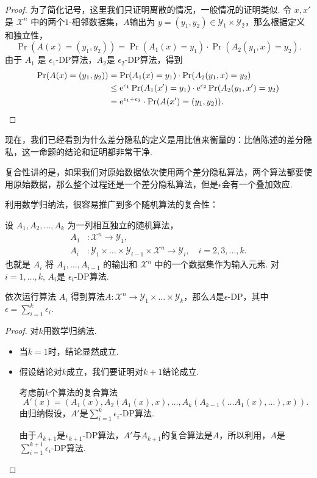 \begin{proof}
为了简化记号，这里我们只证明离散的情况，一般情况的证明类似. 令 $x,x'$ 是 $\mathcal X^n$ 中的两个$1$-相邻数据集，$A$输出为 $y = (y_1, y_2) \in \mathcal Y_1 \times \mathcal Y_2$，那么根据定义和独立性，
    \[
    \Pr(A(x) = (y_1, y_2)) = \Pr(A_1(x) = y_1) \cdot \Pr(A_2(y_1, x) = y_2).
    \]
由于 $A_1$ 是 $\epsilon_1$-DP算法，$A_2$是 $\epsilon_2$-DP算法，得到
    \[
    \begin{aligned}
        \Pr(A(x) = (y_1, y_2)) &= \Pr(A_1(x) = y_1) \cdot \Pr(A_2(y_1, x) = y_2)\\
        &\leq \mathrm{e}^{\epsilon_1} \Pr(A_1(x') = y_1) \cdot \mathrm{e}^{\epsilon_2} \Pr(A_2(y_1, x') = y_2) \\
        &= \mathrm{e}^{\epsilon_1 + \epsilon_2} \cdot \Pr(A(x') = (y_1, y_2)).
    \end{aligned}
    \]
\end{proof}

现在，我们已经看到为什么差分隐私的定义是用比值来衡量的：比值陈述的差分隐私，这一命题的结论和证明都非常干净. 

复合性讲的是，如果我们对原始数据依次使用两个差分隐私算法，两个算法都要使用原始数据，那么整个过程还是一个差分隐私算法，但是$\epsilon$会有一个叠加效应. 

利用数学归纳法，很容易推广到多个随机算法的复合性：

\begin{proposition}\label{proposition:composition-multi}
    设 $A_1, A_2, \dots , A_k$ 为一列相互独立的随机算法， 
    \begin{align*}
        A_1&: \mathcal X^n \to \mathcal Y_1,\\
        A_i&: \mathcal Y_1 \times \dots \times \mathcal Y_{i-1} \times \mathcal X^n \to \mathcal Y_i,\quad i = 2, 3, \dots, k.
    \end{align*}
    也就是 $A_i$ 将 $A_1, \dots, A_{i-1}$ 的输出和 $\mathcal X^n$ 中的一个数据集作为输入元素. 对$i=1,\dots,k$, $A_i$是 $\epsilon_i$-DP算法. 
        
    依次运行算法 $A_i$ 得到算法$A : \mathcal X^n \to \mathcal Y_1 \times \dots \times \mathcal Y_k$，那么$A$是$\epsilon$-DP，其中$\epsilon = \sum_{i=1}^k \epsilon_i$.
\end{proposition}
\begin{proof}
    对$k$用数学归纳法. 
    \begin{itemize}
        \item 当$k=1$时，结论显然成立.
        \item 假设结论对$k$成立，我们要证明对$k+1$结论成立.
        
        考虑前$k$个算法的复合算法
        \[A'(x) = (A_1(x), A_2(A_1(x), x), \dots, A_k(A_{k-1}(\dots A_1(x), \dots), x)).\]
        由归纳假设，$A'$是$\sum_{i=1}^k\epsilon_i$-DP算法.

        由于$A_{k+1}$是$\epsilon_{k+1}$-DP算法，$A'$与$A_{k+1}$的复合算法是$A$，所以利用，$A$是$\sum_{i=1}^{k+1}\epsilon_i$-DP算法.
    \end{itemize}
\end{proof}

